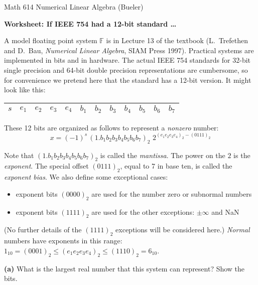 \documentclass[12pt]{amsart}
\newcommand{\epart}[1]{\bigskip\noindent\textbf{(#1)}\quad }
\newcommand{\bitboxes}{
\large
\begin{center}
\begin{tabular}{|c|c|c|c|c|c|c|c|c|c|c|c|} \hline
\phantom{$e_1$} &
\phantom{$e_1$} &
\phantom{$e_1$} &
\phantom{$e_1$} &
\phantom{$e_1$} &
\phantom{$e_1$} &
\phantom{$e_1$} &
\phantom{$e_1$} &
\phantom{$e_1$} &
\phantom{$e_1$} &
\phantom{$e_1$} &
\phantom{$e_1$} \\ \hline
\end{tabular}
\end{center}
\normalsize}
\begin{document}
\scriptsize \noindent Math 614 Numerical Linear Algebra (Bueler) \hfill {}
\normalsize\medskip

\Large\centerline{\textbf{Worksheet: If IEEE 754 had a 12-bit standard \dots}}
\medskip
\normalsize

\thispagestyle{empty}

A model floating point system $\mathbb{F}$ is in Lecture 13 of the textbook (L.~Trefethen and D.~Bau, \emph{Numerical Linear Algebra}, SIAM Press 1997).  Practical systems are implemented in bits and in hardware.  The actual IEEE 754 standards for 32-bit single precision and 64-bit double precision representations are cumbersome, so for convenience we pretend here that the standard has a 12-bit version.  It might look like this:

\medskip\large
\begin{center}
\begin{tabular}{|c|c|c|c|c|c|c|c|c|c|c|c|} \hline
$s$ & $e_1$ & $e_2$ & $e_3$ & $e_4$ & $b_1$ & $b_2$ & $b_3$ & $b_4$ & $b_5$ & $b_6$ & $b_7$ \\ \hline
\end{tabular}
\end{center}
\medskip\normalsize

\noindent These 12 bits are organized as follows to represent a \emph{nonzero} number:
\medskip\large
	$$x = (-1)^s\,(1.b_1 b_2 b_3 b_4 b_5 b_6 b_7)_2 \,\, 2^{(e_1 e_2 e_3 e_4)_2 - (0111)_2}$$
\normalsize

\noindent Note that $(1.b_1 b_2 b_3 b_4 b_5 b_6 b_7)_2$ is called the \emph{mantissa}.  The power on the $2$ is the \emph{exponent}.  The special offset $(0111)_2$, equal to 7 in base ten, is called the \emph{exponent bias}.  We also define some exceptional cases:
\begin{itemize}
\item exponent bits $(0000)_2$ are used for the number zero or subnormal numbers
\item exponent bits $(1111)_2$ are used for the other exceptions: $\pm\infty$ and NaN
\end{itemize}
(No further details of the $(1111)_2$ exceptions will be considered here.)  \emph{Normal} numbers have exponents in this range: $1_{10} = (0001)_2 \le (e_1 e_2 e_3 e_4)_2 \le (1110)_2=6_{10}$.

\epart{a}  What is the largest real number that this system can represent?  Show the bits.

\bitboxes
\vfill
\end{document}

